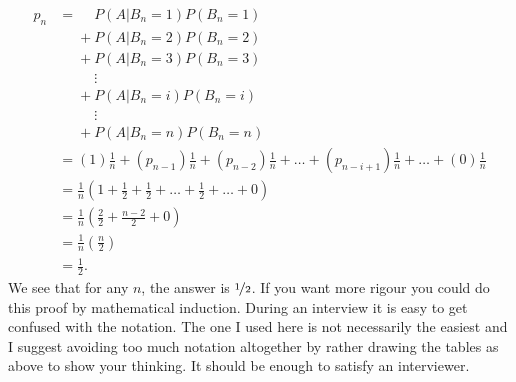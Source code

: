 \documentclass[a4paper]{article}
\begin{document}
\begin{align*}
  p_n
  &=
   \phantom{{} + {}}     P(A|B_n = 1)P(B_n=1) \\
  &\phantom{{} = {}} + P(A|B_n = 2)P(B_n=2) \\
  &\phantom{{} = {}} + P(A|B_n = 3)P(B_n=3) \\
  &\phantom{{} = {}}\phantom{{} + {}} \vdots  \\
  &\phantom{{} = {}} +  P(A|B_n = i)P(B_n=i) \\
  &\phantom{{} = {}}\phantom{{} + {}} \vdots  \\
  &\phantom{{} = {}} +  P(A|B_n = n)P(B_n=n) \\
&= (1)       \frac{1}{n}  +
   (p_{n-1}) \frac{1}{n}  +
   (p_{n-2}) \frac{1}{n}  +
  \ldots +
  (p_{n-i+1})\frac{1}{n} +
  \ldots +
  (0)        \frac{1}{n}  \\
&=\frac{1}{n}\left(1 +  \frac{1}{2} + \frac{1}{2} + \ldots + \frac{1}{2} + \ldots + 0\right) \\
&=\frac{1}{n}\left(\frac{2}{2} + \frac{n-2}{2} + 0\right) \\
&=\frac{1}{n}\left(\frac{n}{2}\right)  \\
&=\frac{1}{2}
\text{.}
\end{align*}
We see that for any $n$, the answer is $\nicefrac{1}{2}$.
If you want more rigour you could do this proof by mathematical induction.
During an interview it is easy to get confused with the notation.
The one I used here is not necessarily the easiest and I suggest avoiding too much notation altogether by rather drawing the tables as above to show your thinking.
It should be enough to satisfy an interviewer.
\end{document}
